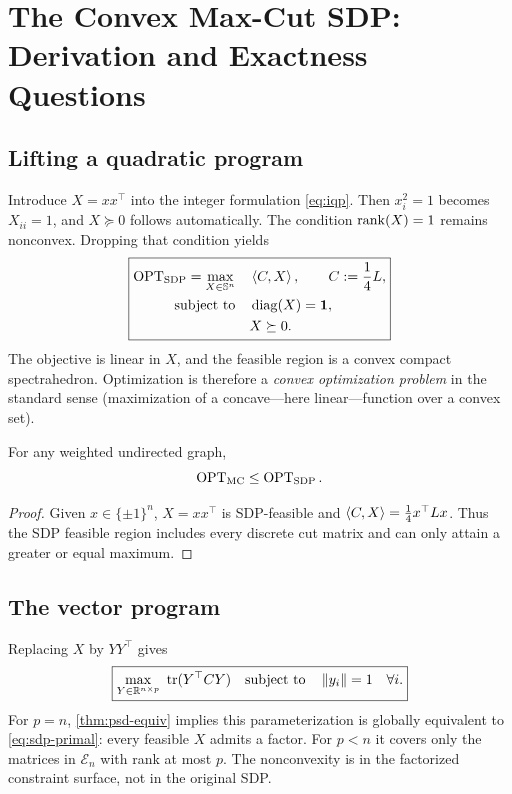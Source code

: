 \chapter{The Convex Max-Cut SDP: Derivation and Exactness Questions}\label{ch:sdp}
\section{Lifting a quadratic program}
Introduce $X=xx^\top$ into the integer formulation \eqref{eq:iqp}. Then $x_i^2=1$ becomes $X_{ii}=1$, and $X\succeq0$ follows automatically. The condition $\operatorname{rank}(X)=1$ remains nonconvex. Dropping that condition yields
\begin{equation}\label{eq:sdp-primal}
\boxed{\begin{aligned}
\operatorname{OPT}_{\mathrm{SDP}}=\max_{X\in\mathbb{S}^n}\quad &\left\langle C,X\right\rangle,\qquad C:=\frac14L,\\
\text{subject to}\quad&\operatorname{diag}(X)=\boldsymbol{1},\\
&X\succeq0.
\end{aligned}}
\end{equation}
The objective is linear in $X$, and the feasible region is a convex compact spectrahedron. Optimization is therefore a \emph{convex optimization problem} in the standard sense (maximization of a concave---here linear---function over a convex set).

\begin{proposition}\label{prop:upper}
For any weighted undirected graph,
\[
\operatorname{OPT}_{\mathrm{MC}}\le\operatorname{OPT}_{\mathrm{SDP}}.
\]
\end{proposition}
\begin{proof}
Given $x\in\{\pm1\}^n$, $X=xx^\top$ is SDP-feasible and $\left\langle C,X\right\rangle=\frac14x^\top Lx$. Thus the SDP feasible region includes every discrete cut matrix and can only attain a greater or equal maximum.
\end{proof}

\section{The vector program}
Replacing $X$ by $YY^\top$ gives
\begin{equation}\label{eq:bm}
\boxed{\max_{Y\in\mathbb{R}^{n\times p}}\ \operatorname{tr}(Y^\top CY)\quad \text{subject to}\quad \left\lVert y_i\right\rVert=1\quad\forall i.}
\end{equation}
For $p=n$, \cref{thm:psd-equiv} implies this parameterization is globally equivalent to \eqref{eq:sdp-primal}: every feasible $X$ admits a factor. For $p<n$ it covers only the matrices in $\mathcal E_n$ with rank at most $p$. The nonconvexity is in the factorized constraint surface, not in the original SDP.

